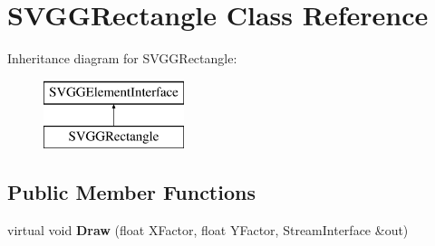 \hypertarget{classSVGGRectangle}{
\section{SVGGRectangle Class Reference}
\label{classSVGGRectangle}
}
Inheritance diagram for SVGGRectangle:\begin{figure}[H]
\begin{center}
\leavevmode
\includegraphics[height=2.000000cm]{classSVGGRectangle}
\end{center}
\end{figure}
\subsection*{Public Member Functions}
\begin{DoxyCompactItemize}
\item 
\hypertarget{classSVGGRectangle_a272fee1e0e03281b7f64b312cb3d4a85}{
virtual void {\bfseries Draw} (float XFactor, float YFactor, StreamInterface \&out)}
\label{classSVGGRectangle_a272fee1e0e03281b7f64b312cb3d4a85}

\end{DoxyCompactItemize}
